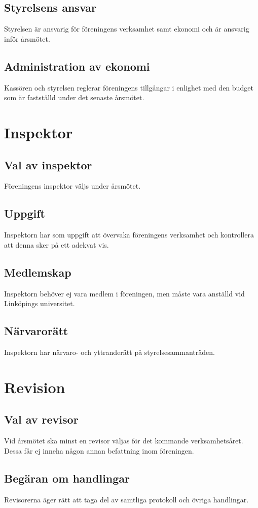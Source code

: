 \documentclass[11pt,a4paper]{article}
\begin{document}
\subsection{Styrelsens ansvar}
Styrelsen är ansvarig för  föreningens verksamhet samt ekonomi och är ansvarig inför årsmötet.
\subsection{Administration av ekonomi}
Kassören och styrelsen reglerar föreningens tillgångar i enlighet med den budget som är fastställd under det senaste årsmötet.




\section{Inspektor}

\subsection{Val av inspektor}
Föreningens inspektor väljs under årsmötet.
\subsection{Uppgift}
Inspektorn har som uppgift att övervaka föreningens verksamhet och kontrollera att denna sker på ett adekvat vis.\subsection{Medlemskap}
Inspektorn behöver ej vara medlem i föreningen, men måste vara anställd vid Linköpings universitet.
\subsection{Närvarorätt}
Inspektorn har närvaro- och yttranderätt på styrelsesammanträden.


\section{Revision}

\subsection{Val av revisor}
Vid årsmötet ska minst en revisor väljas för det kommande verksamhetsåret. Dessa får ej inneha någon annan befattning inom föreningen.
\subsection{Begäran om handlingar}
Revisorerna äger rätt att taga del av samtliga protokoll och övriga handlingar.
\end{document}
